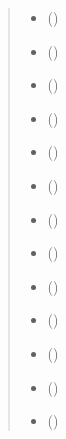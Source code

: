\documentclass[a4paper,11pt,english,openany]{sphinxmanual}
\begin{document}
\begin{fulllineitems}
\begin{fulllineitems}
\begin{quote}
\begin{description}
\begin{itemize}
\item {} 
\sphinxAtStartPar
{} ()

\item {} 
\sphinxAtStartPar
{} ()

\item {} 
\sphinxAtStartPar
{} ()

\item {} 
\sphinxAtStartPar
{} ()

\item {} 
\sphinxAtStartPar
{} ()

\item {} 
\sphinxAtStartPar
{} ()

\item {} 
\sphinxAtStartPar
{} ()

\item {} 
\sphinxAtStartPar
{} ()

\item {} 
\sphinxAtStartPar
{} ()

\item {} 
\sphinxAtStartPar
{} ()

\item {} 
\sphinxAtStartPar
{} ()

\item {} 
\sphinxAtStartPar
{} ()

\item {} 
\sphinxAtStartPar
{} ()


\end{itemize}
\end{description}
\end{quote}
\end{fulllineitems}
\end{fulllineitems}
\end{document}

